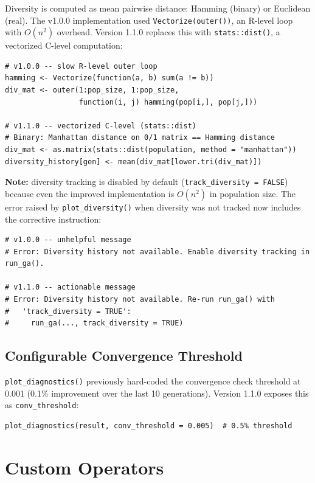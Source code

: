 \documentclass[11pt,a4paper]{article}
\begin{document}
Diversity is computed as mean pairwise distance: Hamming (binary) or Euclidean
(real). The v1.0.0 implementation used \texttt{Vectorize(outer())}, an R-level
loop with $O(n^2)$ overhead. Version 1.1.0 replaces this with
\texttt{stats::dist()}, a vectorized C-level computation:

\begin{lstlisting}
# v1.0.0 -- slow R-level outer loop
hamming <- Vectorize(function(a, b) sum(a != b))
div_mat <- outer(1:pop_size, 1:pop_size,
                 function(i, j) hamming(pop[i,], pop[j,]))

# v1.1.0 -- vectorized C-level (stats::dist)
# Binary: Manhattan distance on 0/1 matrix == Hamming distance
div_mat <- as.matrix(stats::dist(population, method = "manhattan"))
diversity_history[gen] <- mean(div_mat[lower.tri(div_mat)])
\end{lstlisting}

\textbf{Note:} diversity tracking is disabled by default
(\texttt{track\_diversity = FALSE}) because even the improved implementation
is $O(n^2)$ in population size. The error raised by \texttt{plot\_diversity()}
when diversity was not tracked now includes the corrective instruction:

\begin{lstlisting}
# v1.0.0 -- unhelpful message
# Error: Diversity history not available. Enable diversity tracking in run_ga().

# v1.1.0 -- actionable message
# Error: Diversity history not available. Re-run run_ga() with
#   'track_diversity = TRUE':
#     run_ga(..., track_diversity = TRUE)
\end{lstlisting}

\subsection{Configurable Convergence Threshold}

\texttt{plot\_diagnostics()} previously hard-coded the convergence check
threshold at 0.001 (0.1\% improvement over the last 10 generations). Version
1.1.0 exposes this as \texttt{conv\_threshold}:

\begin{lstlisting}
plot_diagnostics(result, conv_threshold = 0.005)  # 0.5% threshold
\end{lstlisting}

\section{Custom Operators}
\end{document}
